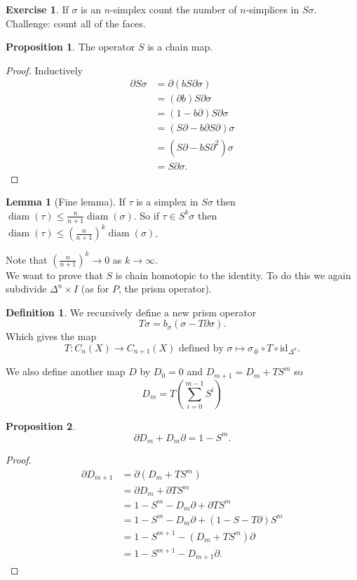 \documentclass[12pt]{article}
\theoremstyle{definition}
\newtheorem*{lem}{Lemma}
\newtheorem*{prop}{Proposition}
\theoremstyle{definition}
\newtheorem*{defn}{Definition}
\newtheorem*{exer}{Exercise}
\DeclareMathOperator{\diam}{diam}
\begin{document}
\begin{exer}
If $\sigma$ is an $n$-simplex count the number of $n$-simplices in $S\sigma$.
Challenge: count all of the faces.
\end{exer}

\begin{prop}
The operator $S$ is a chain map.
\end{prop}
\begin{proof}
Inductively
\begin{align*}
\partial S \sigma &= \partial(bS\partial \sigma)\\
&= (\partial b) S\partial \sigma\\
&= (1 - b \partial) S\partial \sigma\\
&= (S\partial - b \partial S \partial) \sigma\\
&= (S\partial - b S \partial^2) \sigma\\
&= S\partial \sigma.
\end{align*}
\end{proof}

\begin{lem}[Fine lemma]
If $\tau$ is a simplex in $S \sigma$ then $\diam(\tau)  \le \frac{n}{n+1}\diam (\sigma)$.
So if $\tau \in S^k \sigma$ then $\diam(\tau) \le \left(\frac{n}{n+1}\right)^k \diam(\sigma)$.
\end{lem}
Note that $\left(\frac{n}{n+1}\right)^k \to 0$ as $k \to \infty$.\\

We want to prove that $S$ is chain homotopic to the identity.
To do this we again subdivide $\Delta^n \times I$ (as for $P$, the prism operator).

\begin{defn}
We recursively define a new prism operator
\[
T\sigma = b_\sigma(\sigma - T\partial \sigma).
\]
Which gives the map
\[
T\colon C_n(X) \to C_{n+1}(X) \text{ defined by } \sigma \mapsto \sigma_\# \circ T \circ \text{id}_{\Delta^n}.
\]

We also define another map $D$ by $D_0 = 0$ and $D_{m+1} = D_m + TS^m$ so
\[
D_m = T\left( \sum_{i=0}^{m-1} S^i\right)
\]
\end{defn}

\begin{prop}
\[
\partial D_m  + D_m \partial = 1 - S^m.
\]
\end{prop}
\begin{proof}
\begin{align*}
\partial D_{m+1} &= \partial (D_m +  TS^m)\\
&= \partial D_m + \partial TS^m \\
&= 1 - S^m -  D_m\partial  + \partial TS^m \\
&= 1 - S^m -  D_m\partial  + (1 - S - T\partial)S^m \\
&= 1 - S^{m+1} - (D_m +  TS^m)\partial \\
&= 1 - S^{m+1} - D_{m+1}\partial.
\end{align*}
\end{proof}
\end{document}
